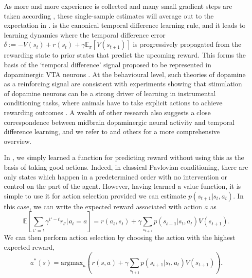 As more and more experience is collected and many small gradient steps are taken according , these single-sample estimates will average out to the expectation in .
 is the canonical temporal difference learning rule, and it leads to learning dynamics where the temporal difference error $\delta := - V(s_t) + r(s_t) + \gamma \mathbb{E}_\pi \left [ V(s_{t+1}) \right ]$ is progressively propagated from the rewarding state to prior states that predict the upcoming reward.
This forms the basis of the `temporal difference' signal proposed to be represented in dopaminergic VTA neurons \citep{schultz1997neural}.
At the behavioural level, such theories of dopamine as a reinforcing signal are consistent with experiments showing that stimulation of dopamine neurons can be a strong driver of learning in instrumental conditioning tasks, where animals have to take explicit actions to achieve rewarding outcomes \citep{olds1954positive, tsai2009phasic}.
A wealth of other research also suggests a close correspondence between midbrain dopaminergic neural activity and temporal difference learning, and we refer to \citet{niv2009reinforcement} and others for a more comprehensive overview.

In , we simply learned a function for predicting reward without using this as the basis of taking good actions.
Indeed, in classical Pavlovian conditioning, there are only states which happen in a predetermined order with no intervention or control on the part of the agent.
However, having learned a value function, it is simple to use it for action selection provided we can estimate $p(s_{t+1} | s_t, a_t)$.
In this case, we can write the expected reward associated with action $a$ as
\begin{equation}
    \mathbb{E} \left [\sum_{t' = t} \gamma^{t'-t} r_{t'} | a_t = a \right ] = r(a_t, s_t) + \gamma \sum_{s_{t+1}} p(s_{t+1} | s_t, a_t) V(s_{t+1}).
\end{equation}
We can then perform action selection by choosing the action with the highest expected reward,
\begin{equation}
    \label{eq:value_action_selection}
    a^*(s) = \text{argmax}_{a} \left ( r(s, a) + \gamma \sum_{s_{t+1}} p(s_{t+1} | s_t, a_t) V(s_{t+1}) \right ).
\end{equation}


